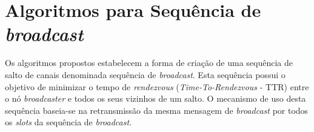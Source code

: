 \section{Algoritmos para Sequência de \textit{broadcast}} 
\label{sec:prop_cap_broadcast}




Os algoritmos propostos estabelecem a forma de criação de uma sequência de salto de canais denominada sequência de {\it broadcast}. Esta sequência possui o objetivo de minimizar o tempo de {\it rendezvous}  ({\it Time-To-Rendezvous} - TTR) entre o nó {\it broadcaster} e todos os seus vizinhos de um salto. O mecanismo de uso desta sequência baseia-se na retransmissão da mesma mensagem de {\it broadcast} por todos os {\it slots} da sequência de {\it broadcast}. 




